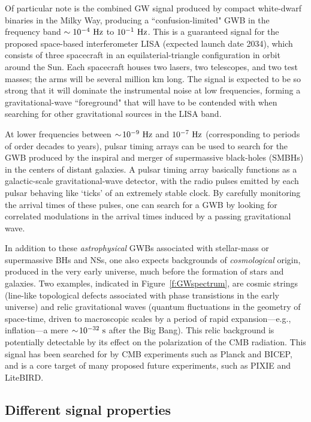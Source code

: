\documentclass[11pt]{article}
\numberwithin{equation}{section}
\begin{document}
Of particular note is the combined GW 
signal produced by compact white-dwarf binaries in 
the Milky Way, producing a ``confusion-limited" GWB
in the frequency band $\sim 10^{-4}~{\rm Hz}$ to 
$10^{-1}~{\rm Hz}$.
This is a guaranteed signal for the proposed 
space-based interferometer LISA (expected launch date 2034), 
which consists of three spacecraft in an 
equilaterial-triangle configuration 
in orbit around the Sun.
Each spacecraft houses two lasers, two telescopes, and 
two test masses; 
the arms will be several million km long.
The signal is expected to be so strong that it will
dominate the instrumental noise at low frequencies, 
forming a gravitational-wave ``foreground" that will
have to be contended with when searching for other 
gravitational sources in the LISA band.

At lower frequencies between 
$\sim\!10^{-9}~{\rm Hz}$ and $10^{-7}~{\rm Hz}$
(corresponding to periods of order decades to years), 
pulsar timing arrays can be used to 
search for the GWB produced by the inspiral and merger 
of supermassive black-holes (SMBHs) in the centers of
distant galaxies.
A pulsar timing array basically functions as a 
galactic-scale gravitational-wave detector, with the
radio pulses emitted by each pulsar behaving like 
`ticks' of an extremely stable clock.
By carefully monitoring the arrival times of these
pulses, one can search for a GWB by looking for 
correlated modulations in the arrival times 
induced by a passing gravitational wave.

In addition to these {\em astrophysical} GWBs 
associated with stellar-mass or supermassive BHs 
and NSs, one also expects backgrounds of 
{\em cosmological} origin, produced in the 
very early universe, much before the formation of 
stars and galaxies.  
Two examples, indicated in Figure~\ref{f:GWspectrum}, 
are cosmic strings (line-like topological defects 
associated with 
phase transistions in the early universe) and
relic gravitational waves (quantum 
fluctuations in the geometry of space-time, 
driven to macroscopic scales by a period of rapid 
expansion---e.g., inflation---a mere 
$\sim\!10^{-32}~{\rm s}$ after the Big Bang).
This relic background is potentially detectable 
by its effect on the polarization of the CMB radiation.
This signal has been searched for by CMB experiments
such as Planck and BICEP, and is a core target of many
proposed future experiments, such as PIXIE and LiteBIRD.

\subsection{Different signal properties}
\label{s:different_signal_properties}
\end{document}
